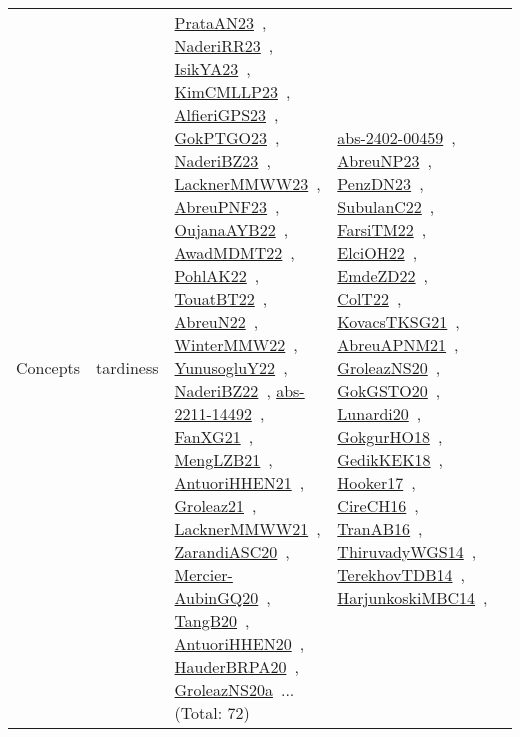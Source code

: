 {\begin{longtable}{lp{3cm}>{\raggedright\arraybackslash}p{6cm}>{\raggedright\arraybackslash}p{6cm}>{\raggedright\arraybackslash}p{8cm}}
Concepts & tardiness & \href{../works/PrataAN23.pdf}{PrataAN23}~\cite{PrataAN23}, \href{../works/NaderiRR23.pdf}{NaderiRR23}~\cite{NaderiRR23}, \href{../works/IsikYA23.pdf}{IsikYA23}~\cite{IsikYA23}, \href{../works/KimCMLLP23.pdf}{KimCMLLP23}~\cite{KimCMLLP23}, \href{../works/AlfieriGPS23.pdf}{AlfieriGPS23}~\cite{AlfieriGPS23}, \href{../works/GokPTGO23.pdf}{GokPTGO23}~\cite{GokPTGO23}, \href{../works/NaderiBZ23.pdf}{NaderiBZ23}~\cite{NaderiBZ23}, \href{../works/LacknerMMWW23.pdf}{LacknerMMWW23}~\cite{LacknerMMWW23}, \href{../works/AbreuPNF23.pdf}{AbreuPNF23}~\cite{AbreuPNF23}, \href{../works/OujanaAYB22.pdf}{OujanaAYB22}~\cite{OujanaAYB22}, \href{../works/AwadMDMT22.pdf}{AwadMDMT22}~\cite{AwadMDMT22}, \href{../works/PohlAK22.pdf}{PohlAK22}~\cite{PohlAK22}, \href{../works/TouatBT22.pdf}{TouatBT22}~\cite{TouatBT22}, \href{../works/AbreuN22.pdf}{AbreuN22}~\cite{AbreuN22}, \href{../works/WinterMMW22.pdf}{WinterMMW22}~\cite{WinterMMW22}, \href{../works/YunusogluY22.pdf}{YunusogluY22}~\cite{YunusogluY22}, \href{../works/NaderiBZ22.pdf}{NaderiBZ22}~\cite{NaderiBZ22}, \href{../works/abs-2211-14492.pdf}{abs-2211-14492}~\cite{abs-2211-14492}, \href{../works/FanXG21.pdf}{FanXG21}~\cite{FanXG21}, \href{../works/MengLZB21.pdf}{MengLZB21}~\cite{MengLZB21}, \href{../works/AntuoriHHEN21.pdf}{AntuoriHHEN21}~\cite{AntuoriHHEN21}, \href{../works/Groleaz21.pdf}{Groleaz21}~\cite{Groleaz21}, \href{../works/LacknerMMWW21.pdf}{LacknerMMWW21}~\cite{LacknerMMWW21}, \href{../works/ZarandiASC20.pdf}{ZarandiASC20}~\cite{ZarandiASC20}, \href{../works/Mercier-AubinGQ20.pdf}{Mercier-AubinGQ20}~\cite{Mercier-AubinGQ20}, \href{../works/TangB20.pdf}{TangB20}~\cite{TangB20}, \href{../works/AntuoriHHEN20.pdf}{AntuoriHHEN20}~\cite{AntuoriHHEN20}, \href{../works/HauderBRPA20.pdf}{HauderBRPA20}~\cite{HauderBRPA20}, \href{../works/GroleazNS20a.pdf}{GroleazNS20a}~\cite{GroleazNS20a}... (Total: 72) & \href{../works/abs-2402-00459.pdf}{abs-2402-00459}~\cite{abs-2402-00459}, \href{../works/AbreuNP23.pdf}{AbreuNP23}~\cite{AbreuNP23}, \href{../works/PenzDN23.pdf}{PenzDN23}~\cite{PenzDN23}, \href{../works/SubulanC22.pdf}{SubulanC22}~\cite{SubulanC22}, \href{../works/FarsiTM22.pdf}{FarsiTM22}~\cite{FarsiTM22}, \href{../works/ElciOH22.pdf}{ElciOH22}~\cite{ElciOH22}, \href{../works/EmdeZD22.pdf}{EmdeZD22}~\cite{EmdeZD22}, \href{../works/ColT22.pdf}{ColT22}~\cite{ColT22}, \href{../works/KovacsTKSG21.pdf}{KovacsTKSG21}~\cite{KovacsTKSG21}, \href{../works/AbreuAPNM21.pdf}{AbreuAPNM21}~\cite{AbreuAPNM21}, \href{../works/GroleazNS20.pdf}{GroleazNS20}~\cite{GroleazNS20}, \href{../works/GokGSTO20.pdf}{GokGSTO20}~\cite{GokGSTO20}, \href{../works/Lunardi20.pdf}{Lunardi20}~\cite{Lunardi20}, \href{../works/GokgurHO18.pdf}{GokgurHO18}~\cite{GokgurHO18}, \href{../works/GedikKEK18.pdf}{GedikKEK18}~\cite{GedikKEK18}, \href{../works/Hooker17.pdf}{Hooker17}~\cite{Hooker17}, \href{../works/CireCH16.pdf}{CireCH16}~\cite{CireCH16}, \href{../works/TranAB16.pdf}{TranAB16}~\cite{TranAB16}, \href{../works/ThiruvadyWGS14.pdf}{ThiruvadyWGS14}~\cite{ThiruvadyWGS14}, \href{../works/TerekhovTDB14.pdf}{TerekhovTDB14}~\cite{TerekhovTDB14}, \href{../works/HarjunkoskiMBC14.pdf}{HarjunkoskiMBC14}~\cite{HarjunkoskiMBC14}, 
\end{longtable}}
